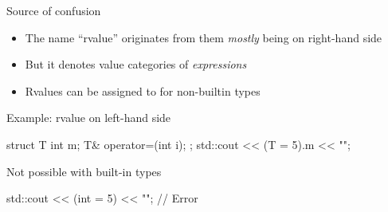 \begin{frame}[fragile]
  \begin{block}{Source of confusion}
    \begin{itemize}
      \item The name ``rvalue'' originates from them \textit{mostly} being on right-hand side
      \item But it denotes value categories of \emph{expressions}
      \item Rvalues can be assigned to for non-builtin types
    \end{itemize}
  \end{block}

  \begin{exampleblock}{Example: rvalue on left-hand side}
    \begin{cppcode*}{}
      struct T{
        int m;
        T& operator=(int i);
      };
      std::cout << (T{} = 5).m << "\n";
    \end{cppcode*}
  \end{exampleblock}

  \begin{alertblock}{Not possible with built-in types}
    \begin{cppcode*}{}
      std::cout << (int{} = 5) << "\n"; // Error
    \end{cppcode*}
  \end{alertblock}
\end{frame}

